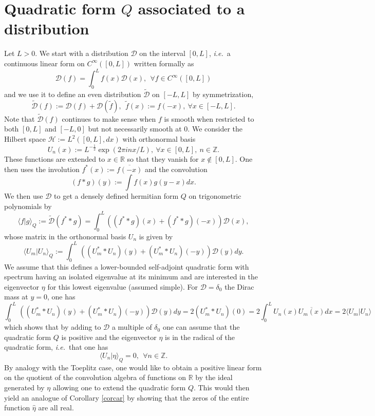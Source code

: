 \documentclass{amsart}
\def\R{{\mathbb R}}
\def\Z{{\mathbb Z}}
\def\cD{{\mathcal D}}
\def\cH{{\mathcal H}}
\newcommand{\ie}{{\it i.e.\/}\ }
\def\R{{\mathbb R}}
\def\Z{{\mathbb Z}}
\def\cD{{\mathcal D}}
\def\cH{{\mathcal H}}
\def\tilde{\widetilde}
\begin{document}
\section{Quadratic form $Q$ associated to a distribution}
Let $L>0$. We start with a  distribution $\cD$ on the interval $[0,L]$, \ie a continuous  linear form 
on $C^\infty([0,L])$ written formally as 
$$
\cD(f)=\int_0^L f(x)\cD(x), \ \ \forall f\in C^\infty([0,L])
$$
and we use it to define an even distribution  $\tilde \cD$ on $[-L,L]$ by symmetrization, 
\begin{equation}\label{symet}
\tilde \cD(f):=\cD(f)+\cD(\tilde f), \ \ \tilde f(x):=f(-x),\  \forall x \in [-L,L].
\end{equation} 
Note that $\tilde \cD(f)$ continues to make sense when $f$ is smooth when restricted to both $[0,L]$ and $[-L,0]$
but not necessarily smooth at $0$. 
 We consider the Hilbert space $\cH:=L^2([0,L],dx)$ with orthonormal basis 
\begin{equation}\label{basis}
U_n(x):=L^{-\frac 12}\exp(2\pi i nx/L), \ \forall x	\in [0,L], \ n\in \Z.
\end{equation}
These functions are extended to $x\in \R$ so that they vanish for $x\notin [0,L]$. One then uses the involution $f^*(x):=\overline{ f(-x)}$ and the convolution 
$$
(f*g)(y):=\int f(x)g(y-x)dx.
$$
We then use $\cD$ to get a densely defined hermitian form $Q$ on trigonometric polynomials by 
\begin{equation}\label{qua0}
\langle f\vert g\rangle_Q:=\tilde\cD(f^**g)=\int_0^L \left((f^**g)(x)+(f^**g)(-x)\right)\cD(x),
\end{equation}
whose matrix in the orthonormal basis $U_n$ is given by
\begin{equation}\label{quad}
\langle U_m\vert U_n\rangle_Q:=\int_0^L\, \left((U_m^**U_n)(y)+(U_m^**U_n)(-y)\right)\cD(y)dy.
\end{equation}
We assume that this defines a lower-bounded self-adjoint quadratic form with spectrum having an isolated eigenvalue at its minimum  and are interested in the eigenvector $\eta$ for this lowest eigenvalue (assumed simple). \newline
For $\cD=\delta_0$ the Dirac mass at $y=0$, one has 
$$
\int_0^L\, \left((U_m^**U_n)(y)+(U_m^**U_n)(-y)\right)\cD(y)dy=2(U_m^**U_n)(0)=2\int_0^LU_n(x)\overline{U_m(x)}dx=2\langle U_m\vert U_n\rangle
$$
which shows that by adding to $\cD$ a multiple of $\delta_0$ one can assume that the quadratic form $Q$ is positive and the eigenvector $\eta$ is in the radical of the quadratic form, \ie that one has 
$$
\langle U_n\vert \eta\rangle_Q=0, \ \ \forall n\in \Z.
$$
By analogy with the Toeplitz case, one would like to obtain a positive linear form on the quotient of the convolution algebra of functions on $\R$  by the ideal generated by $\eta$ allowing one to extend the quadratic form $Q$. This would then yield  an analogue of Corollary \ref{corcar} by showing that  the zeros of the entire function $\widehat \eta$ are all real.
\end{document}
